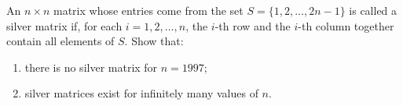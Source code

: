 An $ n \times n$ matrix whose entries come from the set $ S = \{1, 2, \ldots , 2n - 1\}$ is called a silver matrix if, for each $ i = 1, 2, \ldots , n$,  the $ i$-th row and the $ i$-th column together contain all elements of $ S$. Show that:

\begin{enumerate}[label = (\alph*)]
	\item there is no silver matrix for $n = 1997$;
	\item silver matrices exist for infinitely many values of $n$.
\end{enumerate}

